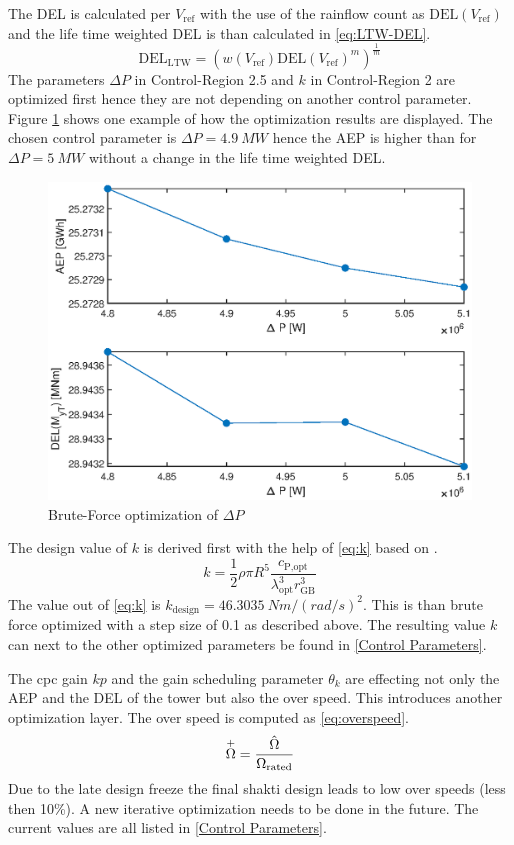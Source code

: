 The \gls{DEL} is calculated per $V_{\text{ref}}$ with the use of the rainflow count as $\text{DEL}(V_{\text{ref}})$ and the life time weighted \gls{DEL} is than calculated in \ref{eq:LTW-DEL}.
\begin{equation}
	\text{DEL}_{\text{LTW}} = \left(w(V_{\text{ref}})\text{DEL}(V_{\text{ref}})^m\right)^{\frac{1}{m}} 
	\label{eq:LTW-DEL}
\end{equation}
The parameters $\Delta P$ in Control-Region 2.5 and  $k$ in Control-Region 2 are optimized first hence they are not depending on another control parameter. Figure \ref{fig:DeltaP} shows one example of how the optimization results are displayed. The chosen control parameter is $\Delta P = \SI{4.9}{MW}$ hence the \gls{AEP} is higher than for $\Delta P = \SI{5}{MW}$ without a change in the life time weighted \gls{DEL}.
\begin{figure}[h]
	\centering	
	\includegraphics[width=12cm]{Figures/DeltaPopt.eps}
	\caption{Brute-Force optimization of $\Delta P$}
	\label{fig:DeltaP}
\end{figure}

The design value of $k$ is derived first with the help of \ref{eq:k} based on \cite{SchlipfLecture}.
\begin{equation}
	k = \frac{1}{2}\rho\pi R^5 \frac{c_{\text{P,opt}}}{\lambda_{\text{opt}}^3 r_{\text{GB}}^3}
	\label{eq:k}
\end{equation}
The value out of \ref{eq:k} is $k_{\text{design}} = \SI{46.3035}{Nm/(rad/s)^2}$. This is than brute force optimized with a step size of 0.1 as described above.
The resulting value $k$ can next to the other optimized parameters be found in \ref{Control Parameters}. 

The \gls{cpc} gain $kp$ and the gain scheduling parameter $\theta_k$ are effecting not only the \gls{AEP} and the \gls{DEL} of the tower but also the over speed. This introduces another optimization layer. The over speed is computed as \ref{eq:overspeed}. 
\begin{equation}
	\overset{+}{\Omega} = \frac{\hat{\Omega}}{\Omega_{\textnormal{rated}}}
	\label{eq:overspeed}
\end{equation}  
Due to the late design freeze the final \gls{shakti} design leads to low over speeds (less then 10\%). 
A new iterative optimization needs to be done in the future.
The current values are all listed in \ref{Control Parameters}.